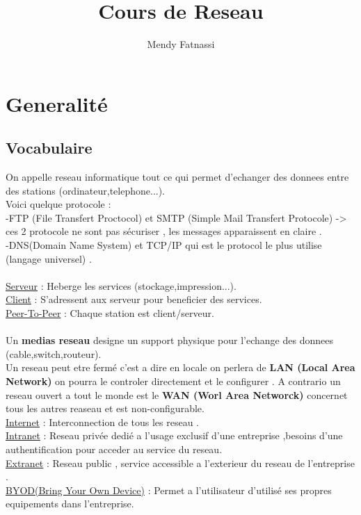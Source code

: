 \documentclass[a4paper,12pt,openany]{book}
\author{Mendy Fatnassi}
\title{Cours de Reseau}
\begin{document}
\maketitle
\tableofcontents

\chapter{Generalité}
\section{Vocabulaire}
On appelle reseau informatique tout ce qui permet d'echanger des donnees entre des stations (ordinateur,telephone...).\\
Voici quelque protocole : \\
-FTP (File Transfert Proctocol) et SMTP (Simple Mail Transfert Protocole) -> ces 2 protocole ne sont pas sécuriser , les messages apparaissent en claire .\\
-DNS(Domain Name System) et TCP/IP qui est le protocol le plus utilise (langage universel) .\\
\\
\underline{Serveur} : Heberge les services (stockage,impression...).\\
\underline{Client} : S'adressent aux serveur pour beneficier des services.\\
\underline{Peer-To-Peer} : Chaque station est client/serveur.\\
\\
Un \textbf{medias reseau} designe un support physique pour l'echange des donnees (cable,switch,routeur).\\
Un reseau peut etre fermé c'est a dire en locale on perlera de \textbf{LAN (Local Area Network)} on pourra le controler directement et le configurer . A contrario un reseau ouvert a tout le monde est le \textbf{WAN (Worl Area Networck)} concernet tous les autres reaseau et est non-configurable.\\

\underline{Internet} : Interconnection de tous les reseau .\\
\underline{Intranet} : Reseau privée dedié a l'usage exclusif d'une entreprise ,besoins d'une authentification pour acceder au service du reseau.\\
\underline{Extranet} : Reseau public , service accessible a l'exterieur du reseau de l'entreprise .\\
\underline{BYOD(Bring Your Own Device)} : Permet a l'utilisateur d'utilisé ses propres equipements dans l'entreprise.\\
\\
\end{document}
